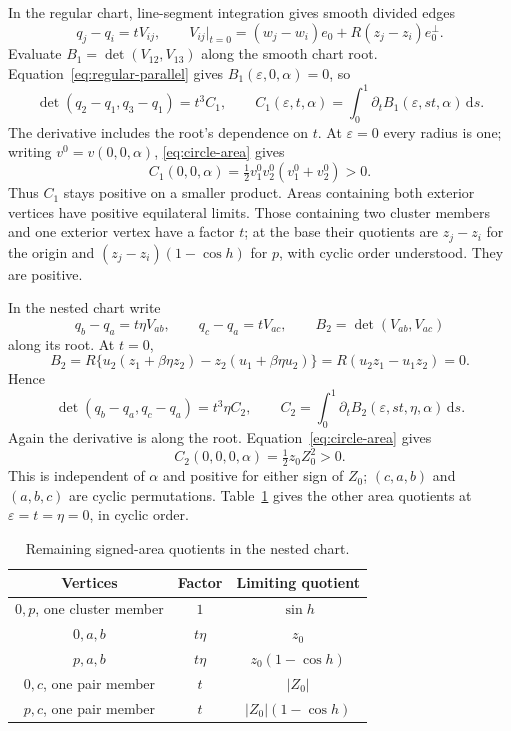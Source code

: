 \documentclass[11pt,a4paper]{article}
\numberwithin{equation}{section}
\theoremstyle{remark}
\newcommand{\eps}{\varepsilon}
\newcommand{\dd}{\,\mathrm d}
\begin{document}
In the regular chart, line-segment integration gives smooth divided edges
\[
 q_j-q_i=tV_{ij},\qquad
 V_{ij}|_{t=0}=(w_j-w_i)e_0+R(z_j-z_i)e_0^\perp.
\]
Evaluate $B_1=\det(V_{12},V_{13})$ along the smooth chart root.
Equation~\eqref{eq:regular-parallel} gives $B_1(\eps,0,\alpha)=0$, so
\begin{equation}\label{eq:regular-area}
 \det(q_2-q_1,q_3-q_1)=t^3C_1,\qquad
 C_1(\eps,t,\alpha)=\int_0^1\partial_tB_1(\eps,st,\alpha)\dd s.
\end{equation}
The derivative includes the root's dependence on $t$.
At $\eps=0$ every radius is one; writing $v^0=v(0,0,\alpha)$, \eqref{eq:circle-area} gives
\[
 C_1(0,0,\alpha)=\tfrac12v^0_1v^0_2(v^0_1+v^0_2)>0.
\]
Thus $C_1$ stays positive on a smaller product.
Areas containing both exterior vertices have positive equilateral limits.
Those containing two cluster members and one exterior vertex have a factor $t$; at the base their quotients are $z_j-z_i$ for the origin and $(z_j-z_i)(1-\cos h)$ for $p$, with cyclic order understood. They are positive.

In the nested chart write
\[
 q_b-q_a=t\eta V_{ab},\qquad q_c-q_a=tV_{ac},\qquad
 B_2=\det(V_{ab},V_{ac})
\]
along its root. At $t=0$,
\[
 B_2=R\{u_2(z_1+\beta\eta z_2)-z_2(u_1+\beta\eta u_2)\}
    =R(u_2z_1-u_1z_2)=0.
\]
Hence
\begin{equation}\label{eq:nest-area}
 \det(q_b-q_a,q_c-q_a)=t^3\eta C_2,\qquad
 C_2=\int_0^1\partial_tB_2(\eps,st,\eta,\alpha)\dd s.
\end{equation}
Again the derivative is along the root. Equation~\eqref{eq:circle-area} gives
\[
 C_2(0,0,0,\alpha)=\tfrac12z_0Z_0^2>0.
\]
This is independent of $\alpha$ and positive for either sign of $Z_0$; $(c,a,b)$ and $(a,b,c)$ are cyclic permutations.
Table~\ref{tab:areas} gives the other area quotients at $\eps=t=\eta=0$, in cyclic order.

\begin{table}[htbp]
\centering
\caption{Remaining signed-area quotients in the nested chart.}\label{tab:areas}
\begin{tabular}{ccc}
\hline
 Vertices&Factor&Limiting quotient\\\hline
 $0,p$, one cluster member&$1$&$\sin h$\\
 $0,a,b$&$t\eta$&$z_0$\\
 $p,a,b$&$t\eta$&$z_0(1-\cos h)$\\
 $0,c$, one pair member&$t$&$|Z_0|$\\
 $p,c$, one pair member&$t$&$|Z_0|(1-\cos h)$\\\hline
\end{tabular}
\end{table}
\end{document}
